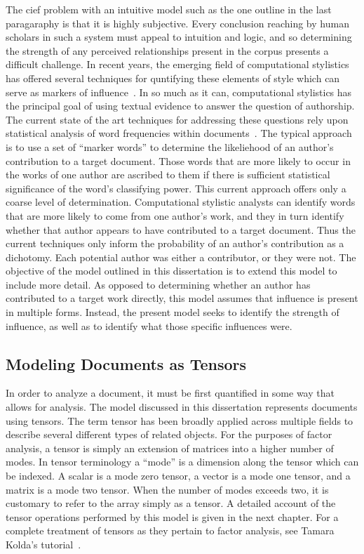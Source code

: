 \documentclass[../dissertation.tex]{subfiles}
\begin{document}
The cief problem with an intuitive model such as the one outline in
the last paragaraphy is that it is highly subjective.  Every
conclusion reaching by human scholars in such a system must appeal to
intuition and logic, and so determining the strength of any perceived
relationships present in the corpus presents a difficult challenge.
In recent years, the emerging field of computational stylistics has
offered several techniques for quntifying these elements of style
which can serve as markers of influence~\cite{bader2007, craig2009,
  burrows2017}.  In so much as it can, computational stylistics has
the principal goal of using textual evidence to answer the question of
authorship.  The current state of the art techniques for addressing
these questions rely upon statistical analysis of word frequencies
within documents~\cite{craig2009}.  The typical
approach is to use a set of ``marker words'' to determine the
likeliehood of an author's contribution to a target document.  Those
words that are more likely to occur in the works of one author are
ascribed to them if there is sufficient statistical significance of
the word's classifying power.  This current approach offers only a
coarse level of determination.  Computational stylistic analysts can
identify words that are more likely to come from one author's work,
and they in turn identify whether that author appears to have
contributed to a target document.  Thus the current techniques only
inform the probability of an author's contribution as a dichotomy.
Each potential author was either a contributor, or they were not.  The
objective of the model outlined in this dissertation is to extend this
model to include more detail.  As opposed to determining whether an
author has contributed to a target work directly, this model assumes
that influence is present in multiple forms.  Instead, the present
model seeks to identify the strength of influence, as well as to
identify what those specific influences were.

\subsection{Modeling Documents as Tensors}
In order to analyze a document, it must be first quantified in some
way that allows for analysis.  The model discussed in this
dissertation represents documents using tensors.  The term tensor has
been broadly applied across multiple fields to describe several
different types of related objects.  For the purposes of factor
analysis, a tensor is simply an extension of matrices into a higher
number of modes. In tensor terminology a ``mode'' is a dimension along
the tensor which can be indexed.  A scalar is a mode zero tensor, a
vector is a mode one tensor, and a matrix is a mode two tensor.  When
the number of modes exceeds two, it is customary to refer to the array
simply as a tensor.  A detailed account of the tensor operations
performed by this model is given in the next chapter.  For a complete
treatment of tensors as they pertain to factor analysis, see Tamara
Kolda's tutorial~\cite{kolda2006}.
\end{document}
